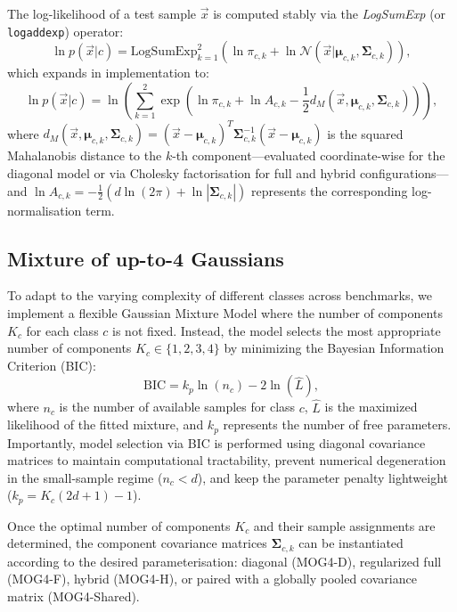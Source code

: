 The log-likelihood of a test sample $\vec{x}$ is computed stably via the \textit{LogSumExp} (or \texttt{logaddexp}) operator:
\begin{equation}
	\ln p(\vec{x}|c) = \text{LogSumExp}_{k=1}^{2} \left( \ln \pi_{c,k} + \ln \mathcal{N}(\vec{x} | \boldsymbol{\mu}_{c,k}, \boldsymbol{\Sigma}_{c,k}) \right),
\end{equation}
which expands in implementation to:
\begin{equation}
	\ln p(\vec{x}|c) = \ln \left( \sum_{k=1}^{2} \exp \left( \ln \pi_{c,k} + \ln A_{c,k} - \frac{1}{2} d_{M}(\vec{x}, \boldsymbol{\mu}_{c,k}, \boldsymbol{\Sigma}_{c,k}) \right) \right),
\end{equation}
where $d_{M}(\vec{x}, \boldsymbol{\mu}_{c,k}, \boldsymbol{\Sigma}_{c,k}) = (\vec{x} - \boldsymbol{\mu}_{c,k})^T \boldsymbol{\Sigma}_{c,k}^{-1} (\vec{x} - \boldsymbol{\mu}_{c,k})$ is the squared Mahalanobis distance to the $k$-th component—evaluated coordinate-wise for the diagonal model or via Cholesky factorisation for full and hybrid configurations—and $\ln A_{c,k} = -\frac{1}{2}(d \ln(2\pi) + \ln|\boldsymbol{\Sigma}_{c,k}|)$ represents the corresponding log-normalisation term.

\subsection{Mixture of up-to-4 Gaussians}

To adapt to the varying complexity of different classes across benchmarks, we implement a flexible Gaussian Mixture Model where the number of components $K_c$ for each class $c$ is not fixed. Instead, the model selects the most appropriate number of components $K_c \in \{1, 2, 3, 4\}$ by minimizing the Bayesian Information Criterion (BIC):
\begin{equation}
	\text{BIC} = k_p \ln(n_c) - 2\ln(\hat{L}),
	\label{eq:bic_mog4}
\end{equation}
where $n_c$ is the number of available samples for class $c$, $\hat{L}$ is the maximized likelihood of the fitted mixture, and $k_p$ represents the number of free parameters. Importantly, model selection via BIC is performed using diagonal covariance matrices to maintain computational tractability, prevent numerical degeneration in the small-sample regime ($n_c < d$), and keep the parameter penalty lightweight ($k_p = K_c(2d + 1) - 1$). 

Once the optimal number of components $K_c$ and their sample assignments are determined, the component covariance matrices $\boldsymbol{\Sigma}_{c,k}$ can be instantiated according to the desired parameterisation: diagonal (MOG4-D), regularized full (MOG4-F), hybrid (MOG4-H), or paired with a globally pooled covariance matrix (MOG4-Shared). 

